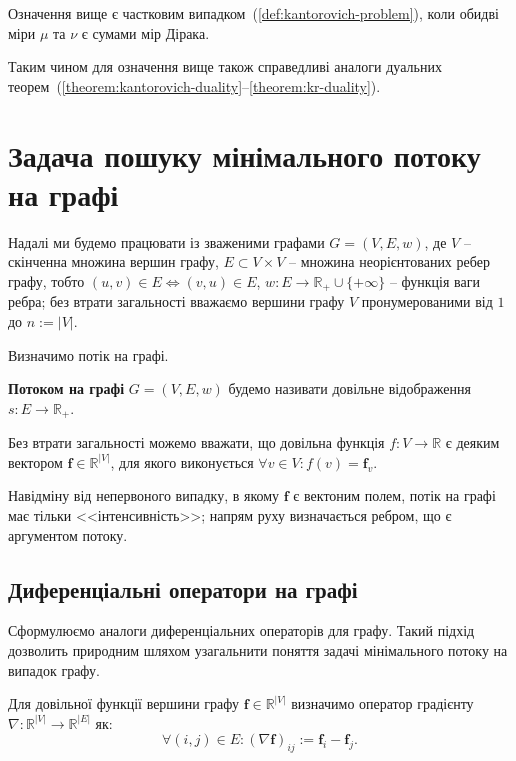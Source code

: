 Означення вище є частковим випадком~(\ref{def:kantorovich-problem}), коли обидві міри $\mu$ та $\nu$ є
сумами мір Дірака.

Таким чином для означення вище також справедливі аналоги дуальних теорем~(\ref{theorem:kantorovich-duality}--\ref{theorem:kr-duality}).

\section{Задача пошуку мінімального потоку на графі}

Надалі ми будемо працювати із зваженими графами $G = (V, E, w)$, де $V$ -- скінченна множина вершин графу,
$E \subset V \times V$ -- множина неорієнтованих ребер графу, тобто $(u, v) \in E \iff (v, u) \in E$, 
$w : E \to \mathbb{R}_+ \cup \{+\infty\}$ -- функція ваги ребра;
без втрати загальності вважаємо вершини графу $V$ пронумерованими від $1$ до $n := |V|$.

Визначимо потік на графі.
\begin{definition}
    \textbf{Потоком на графі} $G = (V, E, w)$ будемо називати довільне відображення $s : E \to \mathbb{R}_+$.
\end{definition}

Без втрати загальності можемо вважати, що довільна функція $f : V \to \mathbb{R}$ 
є деяким вектором $\mathbf{f} \in \mathbb{R}^{|V|}$, для якого виконується $\forall v \in V: f(v) = \mathbf{f}_v$.

Навідміну від непервоного випадку, в якому $\mathbf{f}$ є вектоним полем, потік на графі має тільки <<інтенсивність>>; напрям руху
визначається ребром, що є аргументом потоку.

\subsection{Диференціальні оператори на графі}
Сформулюємо аналоги диференціальних операторів для графу. Такий підхід дозволить природним шляхом узагальнити поняття
задачі мінімального потоку на випадок графу.

\begin{definition}
    \label{def:grad}
    Для довільної функції вершини графу $\mathbf f \in \mathbb{R}^{|V|}$ визначимо оператор градієнту
    $\nabla : \mathbb{R}^{|V|} \to \mathbb{R}^{|E|}$ як:
    $$
        \forall (i, j) \in E: (\nabla \mathbf f)_{ij} := \mathbf{f}_i - \mathbf{f}_j.
    $$
\end{definition}

